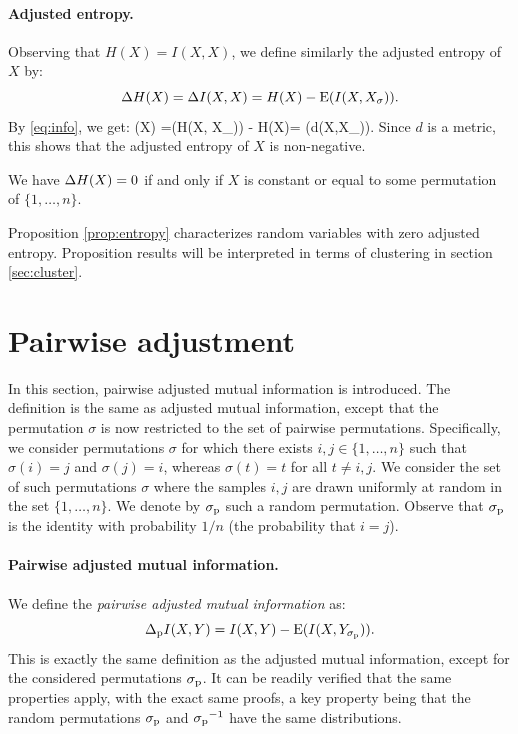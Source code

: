\paragraph{Adjusted entropy.} Observing that $H(X) = I(X, X)$, 
we define similarly the adjusted entropy of $X$ by:
$$
\ha(X) = \ia(X,X) =  H(X) - \E(I(X, X_\sigma)).
$$
By \eqref{eq:info}, we get:
\be\label{eq:ae2}
\ha(X) =\E(H(X, X_\sigma)) - H(X)=  \E(d(X,X_\sigma)).
\ee
Since $d$ is a metric, this shows that the adjusted entropy of $X$ is non-negative. 

\begin{prop}\label{prop:entropy}
	We have $\ha(X) = 0$ if and only if  $X$ is constant or equal to some permutation of $\{1,\ldots,n\}$.
\end{prop}

Proposition \ref{prop:entropy} characterizes random variables with zero adjusted entropy. 
Proposition results will be interpreted in terms of clustering in section \ref{sec:cluster}.

\section{Pairwise adjustment}

In this section, pairwise adjusted mutual information is introduced. 
The definition is the same as adjusted mutual information, except that  the permutation  $\sigma$ is now restricted to the 
set of pairwise permutations. Specifically, we consider permutations $\sigma$ for which there exists $i,j \in \{1,\ldots,n\}$ 
such that $\sigma(i) = j$ and $\sigma(j) = i$, whereas $\sigma(t) = t$ for all $t\ne i,j$.
We consider the set of such permutations $\sigma$ where the samples $i,j$ are drawn uniformly at random in the 
set $\{1,\ldots,n\}$. We denote by $\sp$ such a random permutation. Observe that $\sp$ is the identity with probability 
$1/n$ (the probability that $i=j$). 

\paragraph{Pairwise adjusted mutual information.}
We  define the {\it pairwise adjusted mutual information} as:
$$
\ip(X,Y) = I(X,Y) - \E(I(X, Y_\sp)).
$$
This is exactly the same definition as the adjusted mutual information, except for the considered permutations $\sp$. 
It can be readily verified that the same properties apply, with the exact same proofs, a key property being that the 
random permutations $\sp$ and $\sp^{-1}$ have the same distributions.

